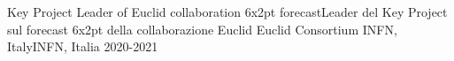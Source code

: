 


\begin{cvhonors}


\cvhonor
{\ifenglish Key Project Leader of Euclid collaboration 6x2pt forecast\else Leader del Key Project sul forecast 6x2pt della collaborazione Euclid\fi} %
{Euclid Consortium} %
{\ifenglish INFN, Italy\else INFN, Italia\fi} %
{2020-2021} %


\end{cvhonors}